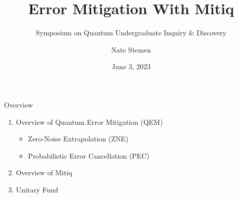 \documentclass[11pt,aspectratio=1610,xcolor=dvipsnames]{beamer}
\title{Error Mitigation With Mitiq}
\subtitle{Symposium on Quantum Undergraduate Inquiry \& Discovery}
\date{June 3, 2023}
\author{Nate Stemen}
\begin{document}
\maketitle

\begin{frame}{Overview}
	\begin{enumerate}
		\item Overview of Quantum Error Mitigation (QEM)
		      \begin{itemize}
			      \item Zero-Noise Extrapolation (ZNE)
			      \item Probabilistic Error Cancellation (PEC)
		      \end{itemize}
		\item Overview of Mitiq
		\item Unitary Fund
	\end{enumerate}
\end{frame}
\end{document}
